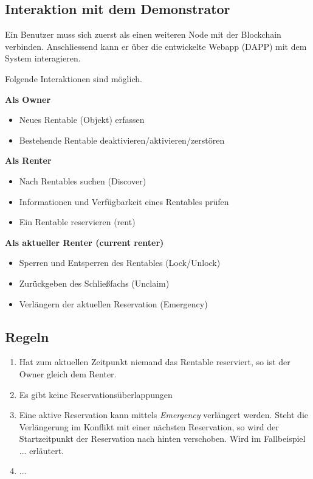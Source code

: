\subsection{Interaktion mit dem Demonstrator}
\label{sec:Interaktion mit dem Demonstrator}

Ein Benutzer muss sich zuerst als einen weiteren Node mit der Blockchain verbinden. Anschliessend kann er über die entwickelte Webapp (DAPP) mit dem System interagieren. 

\vspace{1em}\noindent
Folgende Interaktionen sind möglich.

\vspace{1em}\noindent
\textbf{Als Owner}
\begin{itemize}
    \item Neues Rentable (Objekt) erfassen
    \item Bestehende Rentable deaktivieren/aktivieren/zerstören
\end{itemize}

\vspace{1em}\noindent
\textbf{Als Renter}
\begin{itemize}
    \item Nach Rentables suchen (Discover)
    \item Informationen und Verfügbarkeit eines Rentables prüfen
    \item Ein Rentable reservieren (rent)
\end{itemize}

\vspace{1em}\noindent
\textbf{Als aktueller Renter (current renter)}
\begin{itemize}
    \item Sperren und Entsperren des Rentables (Lock/Unlock)
    \item Zurückgeben des Schließfachs (Unclaim)
    \item Verlängern der aktuellen Reservation (Emergency)
\end{itemize}

\subsection{Regeln}
\begin{enumerate}
    \item Hat zum aktuellen Zeitpunkt niemand das Rentable reserviert, so ist der Owner gleich dem Renter.
    \item Es gibt keine Reservationsüberlappungen
    \item Eine aktive Reservation kann mittels \emph{Emergency} verlängert werden. Steht die Verlängerung im Konflikt mit einer nächsten Reservation, so wird der Startzeitpunkt der Reservation nach hinten verschoben. Wird im Fallbeispiel ... erläutert.
    \item ...
\end{enumerate}



